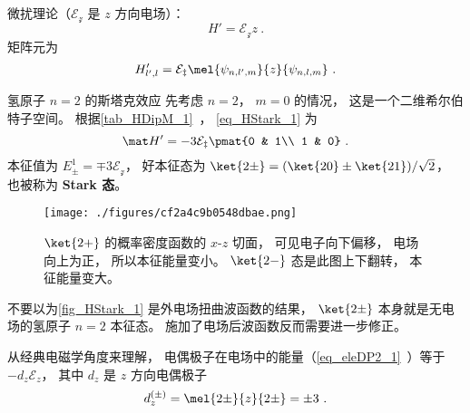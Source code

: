 
\begin{issues}
\issueDraft
\end{issues}


微扰理论（$\mathcal{E_z}$ 是 $z$ 方向电场）：
\begin{equation}
H' = \mathcal{E_z} z~.
\end{equation}
矩阵元为
\begin{equation}\label{eq_HStark_1}
H'_{l',l} = \mathcal{E_z}\mel{\psi_{n,l',m}}{z}{\psi_{n,l,m}}~.
\end{equation}


\begin{example}{氢原子 $n=2$ 的斯塔克效应}
先考虑 $n=2$， $m=0$ 的情况， 这是一个二维希尔伯特子空间。 根据\autoref{tab_HDipM_1}~， \autoref{eq_HStark_1} 为
\begin{equation}
\mat H' = -3\mathcal{E_z}\pmat{0 & 1\\ 1 & 0}~.
\end{equation}
本征值为 $E_{\pm}^1 = \mp 3\mathcal{E_z}$， 好本征态为 $\ket{2\pm} = (\ket{20} \pm \ket{21})/{\sqrt 2}$， 也被称为 \textbf{Stark 态}。

\begin{figure}[ht]
\centering
\texttt{[image: ./figures/cf2a4c9b0548dbae.png]}
\caption{$\ket{2+}$ 的概率密度函数的 $x$-$z$ 切面， 可见电子向下偏移， 电场向上为正， 所以本征能量变小。 $\ket{2-}$ 态是此图上下翻转， 本征能量变大。} \label{fig_HStark_1}
\end{figure}

不要以为\autoref{fig_HStark_1} 是外电场扭曲波函数的结果， $\ket{2\pm}$ 本身就是无电场的氢原子 $n=2$ 本征态。 施加了电场后波函数反而需要进一步修正。

从经典电磁学角度来理解， 电偶极子在电场中的能量（\autoref{eq_eleDP2_1}~）等于 $-d_z \mathcal{E}_z$， 其中 $d_z$ 是 $z$ 方向电偶极子
\begin{equation}
d_z^{(\pm)} = \mel{2\pm}{z}{2\pm} = \pm 3~.
\end{equation}
\end{example}

